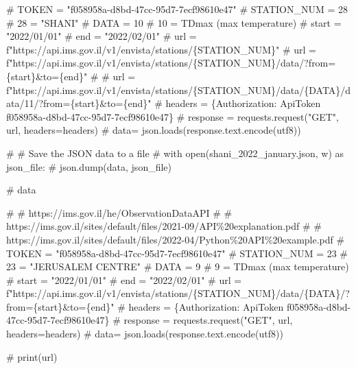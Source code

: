 \documentclass[
  letterpaper,
  DIV=11,
  numbers=noendperiod,
  oneside]{scrreprt}
\newenvironment{Shaded}{\begin{snugshade}}{\end{snugshade}}
\newcommand{\CommentTok}[1]{\textcolor[rgb]{0.37,0.37,0.37}{#1}}
\begin{document}

\begin{Shaded}
\begin{Highlighting}[]
\CommentTok{\# TOKEN = "f058958a{-}d8bd{-}47cc{-}95d7{-}7ecf98610e47"}
\CommentTok{\# STATION\_NUM = 28  \# 28 = "SHANI"}
\CommentTok{\# DATA = 10  \# 10 = TDmax (max temperature)}
\CommentTok{\# start = "2022/01/01"}
\CommentTok{\# end = "2022/02/01"}
\CommentTok{\# url = f"https://api.ims.gov.il/v1/envista/stations/\{STATION\_NUM\}"}
\CommentTok{\# url = f"https://api.ims.gov.il/v1/envista/stations/\{STATION\_NUM\}/data/?from=\{start\}\&to=\{end\}"}
\CommentTok{\# \# url = f"https://api.ims.gov.il/v1/envista/stations/\{STATION\_NUM\}/data/\{DATA\}/data/11/?from=\{start\}\&to=\{end\}"}
\CommentTok{\# headers = \{\textquotesingle{}Authorization\textquotesingle{}: \textquotesingle{}ApiToken f058958a{-}d8bd{-}47cc{-}95d7{-}7ecf98610e47\textquotesingle{}\}}
\CommentTok{\# response = requests.request("GET", url, headers=headers)}
\CommentTok{\# data= json.loads(response.text.encode(\textquotesingle{}utf8\textquotesingle{}))}

\CommentTok{\# \# Save the JSON data to a file}
\CommentTok{\# with open(\textquotesingle{}shani\_2022\_january.json\textquotesingle{}, \textquotesingle{}w\textquotesingle{}) as json\_file:}
\CommentTok{\#     json.dump(data, json\_file)}

\CommentTok{\# data}
\end{Highlighting}
\end{Shaded}

\begin{Shaded}
\begin{Highlighting}[]
\CommentTok{\# \# https://ims.gov.il/he/ObservationDataAPI}
\CommentTok{\# \# https://ims.gov.il/sites/default/files/2021{-}09/API\%20explanation.pdf}
\CommentTok{\# \# https://ims.gov.il/sites/default/files/2022{-}04/Python\%20API\%20example.pdf}
\CommentTok{\# TOKEN = "f058958a{-}d8bd{-}47cc{-}95d7{-}7ecf98610e47"}
\CommentTok{\# STATION\_NUM = 23  \# 23 = "JERUSALEM CENTRE"}
\CommentTok{\# DATA = 9  \# 9 = TDmax (max temperature)}
\CommentTok{\# start = "2022/01/01"}
\CommentTok{\# end = "2022/02/01"}
\CommentTok{\# url = f"https://api.ims.gov.il/v1/envista/stations/\{STATION\_NUM\}/data/\{DATA\}/?from=\{start\}\&to=\{end\}"}
\CommentTok{\# headers = \{\textquotesingle{}Authorization\textquotesingle{}: \textquotesingle{}ApiToken f058958a{-}d8bd{-}47cc{-}95d7{-}7ecf98610e47\textquotesingle{}\}}
\CommentTok{\# response = requests.request("GET", url, headers=headers)}
\CommentTok{\# data= json.loads(response.text.encode(\textquotesingle{}utf8\textquotesingle{}))}

\CommentTok{\# print(url)}
\end{Highlighting}
\end{Shaded}
\end{document}
